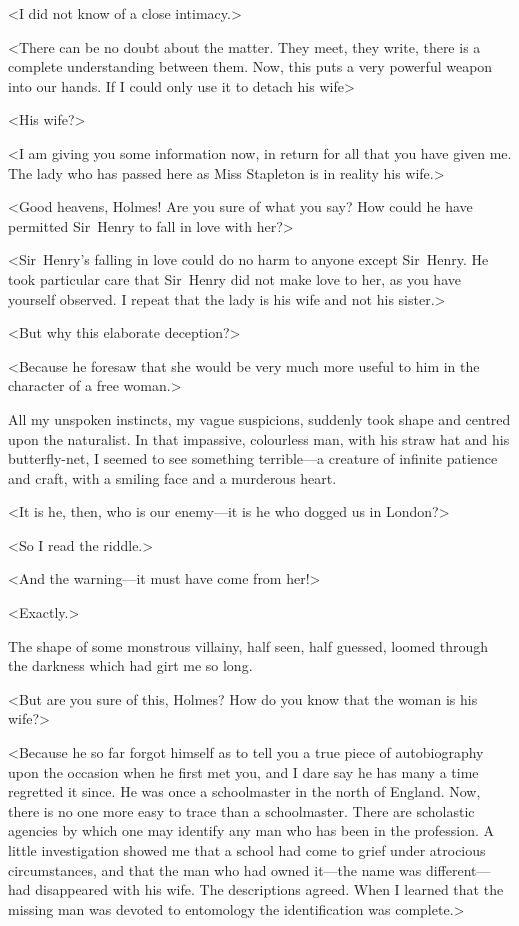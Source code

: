 <I did not know of a close intimacy.>

<There can be no doubt about the matter. They meet, they write, there is a complete understanding between them. Now, this puts a very powerful weapon into our hands. If I could only use it to detach his wife\longdash>

<His wife?>

<I am giving you some information now, in return for all that you have given me. The lady who has passed here as Miss Stapleton is in reality his wife.>

<Good heavens, Holmes! Are you sure of what you say? How could he have permitted Sir~Henry to fall in love with her?>

<Sir~Henry's falling in love could do no harm to anyone except Sir~Henry. He took particular care that Sir~Henry did not make love to her, as you have yourself observed. I repeat that the lady is his wife and not his sister.>

<But why this elaborate deception?>

<Because he foresaw that she would be very much more useful to him in the character of a free woman.>

All my unspoken instincts, my vague suspicions, suddenly took shape and centred upon the naturalist. In that impassive, colourless man, with his straw hat and his butterfly-net, I seemed to see something terrible—a creature of infinite patience and craft, with a smiling face and a murderous heart.

<It is he, then, who is our enemy—it is he who dogged us in London?>

<So I read the riddle.>

<And the warning—it must have come from her!>

<Exactly.>

The shape of some monstrous villainy, half seen, half guessed, loomed through the darkness which had girt me so long.

<But are you sure of this, Holmes? How do you know that the woman is his wife?>

<Because he so far forgot himself as to tell you a true piece of autobiography upon the occasion when he first met you, and I dare say he has many a time regretted it since. He was once a schoolmaster in the north of England. Now, there is no one more easy to trace than a schoolmaster. There are scholastic agencies by which one may identify any man who has been in the profession. A little investigation showed me that a school had come to grief under atrocious circumstances, and that the man who had owned it—the name was different—had disappeared with his wife. The descriptions agreed. When I learned that the missing man was devoted to entomology the identification was complete.>

